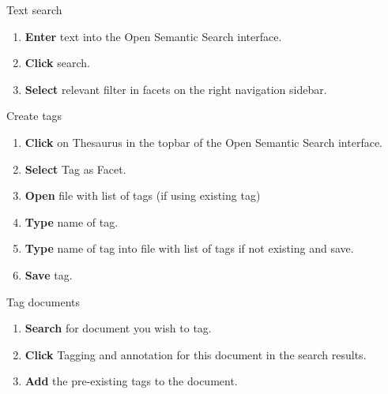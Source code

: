 \documentclass[10pt,a4paper]{article}
\begin{document}
\begin{textbox}{Text search}
 

  

\begin{enumerate}
\item \textbf{Enter} text into the Open Semantic Search interface. 
\item \textbf{Click} search.
\item \textbf{Select} relevant filter in facets on the right navigation sidebar. 
\end{enumerate}

\end{textbox}


\begin{textbox}{Create tags}
 

  

\begin{enumerate}
\item \textbf{Click} on Thesaurus in the topbar of the Open Semantic Search interface.
\item \textbf{Select} Tag as Facet. 
\item \textbf{Open} file with list of tags (if using existing tag)
\item \textbf{Type} name of tag.
\item \textbf{Type} name of tag into file with list of tags if not existing and save.
\item \textbf{Save} tag. 
 
\end{enumerate}

\end{textbox}

\begin{textbox}{Tag documents}

  

\begin{enumerate}
\item \textbf{Search} for document you wish to tag.
\item \textbf{Click} Tagging and annotation for this document in the search results.
\item \textbf{Add} the pre-existing tags to the document. 
\end{enumerate}

\end{textbox}
\end{document}
